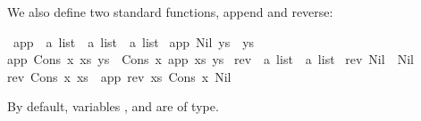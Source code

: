 \begin{isabellebody}
\begin{isamarkuptext}
We also define two standard functions, append and reverse:%
\end{isamarkuptext}%
\isamarkuptrue%
\isamarkupfalse%
\ app\ {}{}\ {}{}a\ list\ {}\ {}a\ list\ {}\ {}a\ list{}\ \isanewline
{}app\ Nil\ ys\ {}\ ys{}\ {}\isanewline
{}app\ {}Cons\ x\ xs{}\ ys\ {}\ Cons\ x\ {}app\ xs\ ys{}{}\isanewline
\isanewline
{}\isamarkupfalse%
\ rev\ {}{}\ {}{}a\ list\ {}\ {}a\ list{}\ \isanewline
{}rev\ Nil\ {}\ Nil{}\ {}\isanewline
{}rev\ {}Cons\ x\ xs{}\ {}\ app\ {}rev\ xs{}\ {}Cons\ x\ Nil{}{}%
\begin{isamarkuptext}%
By default, variables ,  and  are of
 type.


\end{isamarkuptext}
\end{isabellebody}
